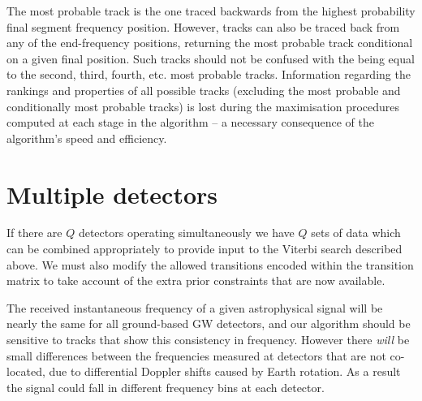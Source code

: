 %
%
The most probable track is the one traced backwards from the highest probability final segment frequency position. However, tracks can also be traced back from any of the end-frequency positions, returning the most probable track conditional on a given final position. Such tracks should not be confused with the being equal to the second, third, fourth, etc. most probable tracks. Information regarding the rankings and properties of all possible tracks (excluding the most probable and conditionally most probable tracks) is lost during the maximisation procedures computed at each stage in the algorithm --  a necessary consequence of the algorithm's speed and efficiency.

\section{\label{viterbi:multidet}Multiple detectors}
%
%
If there are $Q$ detectors operating simultaneously we have $Q$ sets of data which can be combined appropriately to provide input to the Viterbi search described above. We must also modify the allowed transitions encoded within the transition matrix to take account of the extra prior constraints that are now available.

%
%
The received instantaneous frequency of a given astrophysical signal will be nearly the same for all ground-based \ac{GW} detectors, and our
algorithm should be sensitive to tracks that show this consistency in
frequency. However there \emph{will} be small differences between the frequencies measured at detectors that are not co-located, due to differential Doppler shifts caused by Earth rotation. As a result the signal could fall in different frequency bins at each detector.

